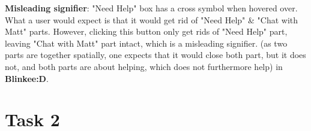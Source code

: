 \documentclass[a4paper,11pt,oneside]{scrreprt}
\begin{document}
\textbf{Misleading signifier}: "Need Help" box has a cross symbol when hovered over. What a user would expect is that it would get rid of "Need Help" \& "Chat with Matt" parts. However, clicking this button only get rids of "Need Help" part, leaving "Chat with Matt" part intact, which is a misleading signifier. (as two parts are together spatially, one expects that it would close both part, but it does not, and both parts are about helping, which does not furthermore help) in \textbf{Blinkee:D}.


\clearpage

\section*{Task 2}
\end{document}
